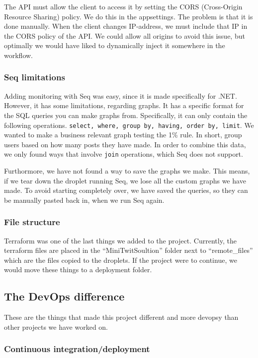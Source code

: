 The API must allow the client to access it by 
setting the CORS (Cross-Origin Resource Sharing) policy.
We do this in the appsettings. The problem is that it is done manually.
When the client changes IP-address, we must include 
that IP in the CORS policy of the API.
We could allow all origins to avoid this issue, 
but optimally we would have liked to dynamically 
inject it somewhere in the workflow.

\subsubsection{Seq limitations}

Adding monitoring with Seq was easy, since it is made specifically for .NET.
However, it has some limitations, regarding graphs.
It has a specific format for the SQL queries you can make graphs from.
Specifically, it can only contain the following operations.
\texttt{select, where, group by, having, order by, limit}.
We wanted to make a business relevant graph testing the 1\% rule\cite{1_perc_rule}.
In short, group users based on how many posts they have made.
In order to combine this data, we only found ways that involve 
\texttt{join} operations, which Seq does not support.

Furthormore, we have not found a way to save the graphs we make.
This means, if we tear down the droplet running Seq,
we lose all the custom graphs we have made.
To avoid starting completely over, we have saved the queries,
so they can be manually pasted back in, when we run Seq again.

\subsubsection{File structure}

Terraform was one of the last things we added to the project.
Currently, the terraform files are placed in the ``MiniTwitSoultion'' 
folder next to ``remote\_files'' which are the files copied to the droplets.
If the project were to continue, we would move these things to a deployment folder.

\subsection{The DevOps difference}

These are the things that made this project different and more devopsy
than other projects we have worked on.

\subsubsection{Continuous integration/deployment}

